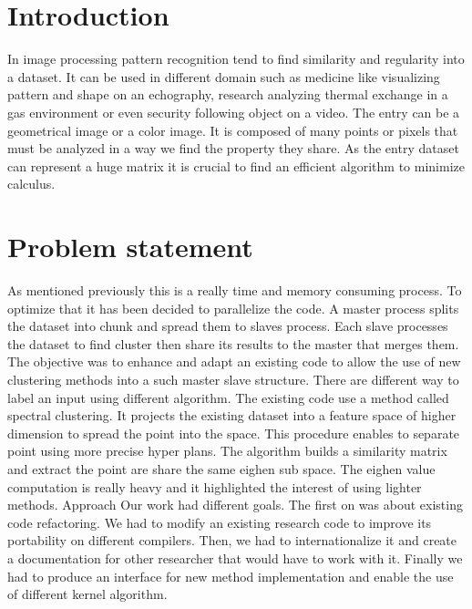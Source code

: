 \section{Introduction}
In image processing pattern recognition tend to find similarity and regularity into a dataset. It can be  used in different domain such as medicine like visualizing pattern and shape on an echography, research analyzing thermal exchange in a gas environment or even security following object on a video. The entry can be a geometrical image or a color image. It is composed of many points or pixels that must be analyzed in a way we find the property they share. As the entry dataset can represent a huge matrix it is crucial to find an efficient algorithm to minimize calculus.

\section{Problem statement}
 As mentioned previously this is a really time and memory consuming process. To optimize that it has been decided to parallelize the code. A master process splits the dataset into chunk and spread them to slaves process. Each slave processes the dataset to find cluster then share its results to the master that merges them. The objective was to enhance and adapt an existing code to allow the use of new clustering methods into a such master slave structure. 
There are different way to label an input using different algorithm. The existing code use a method called spectral clustering. It projects the existing dataset into a feature space of higher dimension to spread the point into the space. This procedure enables to separate point using more precise hyper plans. The algorithm builds a similarity matrix and extract the point are share the same eighen sub space. The eighen value computation is really heavy and it highlighted the interest of using lighter methods.
Approach
Our work had different goals. The first on was about existing code refactoring. We had to modify an existing research code to improve its portability on different compilers. Then, we had to internationalize it and create a documentation for other researcher that would have to work with it. Finally we had to produce an interface for new method implementation and enable the use of different kernel algorithm. 



\begin{figure}[H] %
\caption{}
\label{fig:speciation}
\end{figure}



